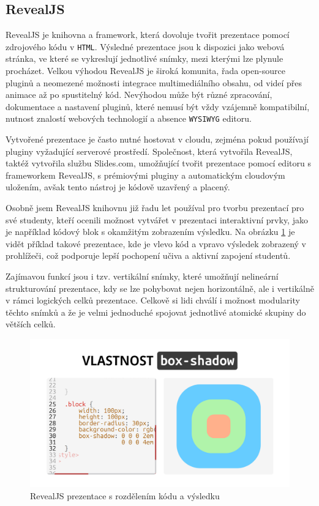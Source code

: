 \subsection{RevealJS}

RevealJS je knihovna a framework, která dovoluje tvořit prezentace pomocí zdrojového kódu v \texttt{HTML}. 
Výsledné prezentace jsou k dispozici jako webová stránka, ve které se vykreslují jednotlivé snímky, mezi kterými lze plynule procházet. 
Velkou výhodou RevealJS je široká komunita, řada open-source pluginů a neomezené možnosti integrace multimediálního obsahu, od videí přes animace až po spustitelný kód. 
Nevýhodou může být různé zpracování, dokumentace a nastavení pluginů, které nemusí být vždy vzájemně kompatibilní, nutnost znalostí webových technologií a absence \texttt{WYSIWYG} editoru. 

Vytvořené prezentace je často nutné hostovat v cloudu, zejména pokud používají pluginy vyžadující serverové prostředí.
Společnost, která vytvořila RevealJS, taktéž vytvořila službu Slides.com, umožňující tvořit prezentace pomocí editoru s frameworkem RevealJS, s prémiovými pluginy a automatickým cloudovým uložením, avšak tento nástroj je kódově uzavřený a placený. 

Osobně jsem RevealJS knihovnu již řadu let používal pro tvorbu prezentací pro své studenty, kteří ocenili možnost vytvářet v prezentaci interaktivní prvky, jako je například kódový blok s okamžitým zobrazením výsledku. 
Na obrázku \ref{fig:analyza:revealjs-ukazka} je vidět příklad takové prezentace, kde je vlevo kód a vpravo výsledek zobrazený v prohlížeči, což podporuje lepší pochopení učiva a aktivní zapojení studentů. 

Zajímavou funkcí jsou i tzv. vertikální snímky, které umožňují nelineární strukturování prezentace, kdy se lze pohybovat nejen horizontálně, ale i vertikálně v rámci logických celků prezentace.
Celkově si lidi chválí i možnost modularity těchto snímků a že je velmi jednoduché spojovat jednotlivé atomické skupiny do větších celků.


\begin{figure}[h!]
    \centering
    \includegraphics[width=0.9\linewidth]{media/03_analyza/revealjs.png}
    \caption{RevealJS prezentace s rozdělením kódu a výsledku}
    \label{fig:analyza:revealjs-ukazka}
\end{figure}

